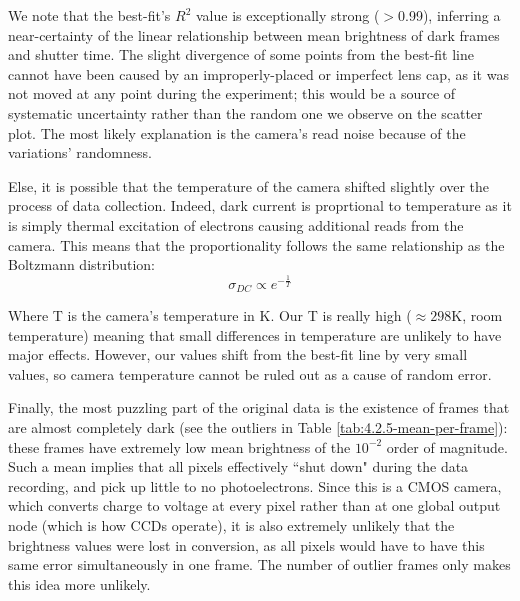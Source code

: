 \documentclass[preprint2]{aastex702}
\begin{document}

			We note that the best-fit's $R^2$ value is exceptionally strong ($>$0.99), inferring a near-certainty of the linear relationship between mean brightness of dark frames and shutter time. The slight divergence of some points from the best-fit line cannot have been caused by an improperly-placed or imperfect lens cap, as it was not moved at any point during the experiment; this would be a source of systematic uncertainty rather than the random one we observe on the scatter plot. The most likely explanation is the camera's read noise because of the variations' randomness.

			Else, it is possible that the temperature of the camera shifted slightly over the process of data collection. Indeed, dark current is proprtional to temperature as it is simply thermal excitation of electrons causing additional reads from the camera. This means that the proportionality follows the same relationship as the Boltzmann distribution:
			\begin{equation}
				\sigma_{DC} \propto e^{-\frac{1}{T}}
			\end{equation}

			Where T is the camera's temperature in K. Our T is really high ($\approx 298$K, room temperature) meaning that small differences in temperature are unlikely to have major effects. However, our values shift from the best-fit line by very small values, so camera temperature cannot be ruled out as a cause of random error.


			Finally, the most puzzling part of the original data is the existence of frames that are almost completely dark (see the outliers in Table \ref{tab:4.2.5-mean-per-frame}): these frames have extremely low mean brightness of the $10^{-2}$ order of magnitude. Such a mean implies that all pixels effectively ``shut down" during the data recording, and pick up little to no photoelectrons. Since this is a CMOS camera, which converts charge to voltage at every pixel rather than at one global output node (which is how CCDs operate), it is also extremely unlikely that the brightness values were lost in conversion, as all pixels would have to have this same error simultaneously in one frame. The number of outlier frames only makes this idea more unlikely.
\end{document}
